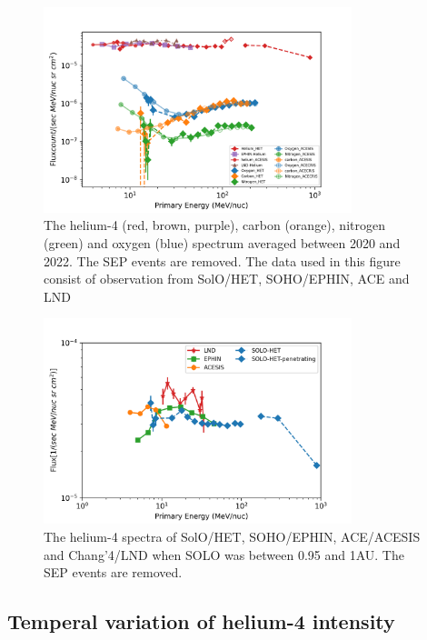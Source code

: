 \begin{figure}[!htb]
    \centering
    \includegraphics[width = 0.8\textwidth]{images/ACR/ACE_SIS_CRIS_SOLO_all_3.png}
    \caption[The quite time spactra of helium, carbon, nitrogen and oxygen between 2020 and 2022]{The helium-4 (red, brown, purple), carbon (orange), nitrogen (green) and oxygen (blue) spectrum averaged between 2020 and 2022. The \ac{SEP} events are removed. The data used in this figure consist of observation from \ac{SolO}/\ac{HET}, \ac{SOHO}/\ac{EPHIN}, \ac{ACE} and \ac{LND}}
    \label{fig:overview}
\end{figure}
\begin{figure}[!htb]
    \centering
    \includegraphics[width = 0.8\textwidth]{images/ACR/1AU_comparison_ACE_EPHIN_SOLO_SEP_version2.png}
    \caption[The helium spectra during the period \ac{SolO} between 0.95 and 1 au]{The helium-4 spectra of \ac{SolO}/\ac{HET}, \ac{SOHO}/\ac{EPHIN}, \ac{ACE}/\ac{ACESIS} and Chang'4/\ac{LND} when SOLO was between 0.95 and 1AU. The \ac{SEP} events are removed.}
    \label{fig:helium_spec_1au}
\end{figure}

\subsection*{Temperal variation of helium-4 intensity}

